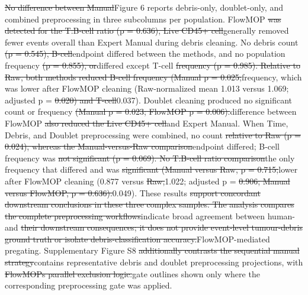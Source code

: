 \documentclass[
  11pt,
  a4paper,
]{article}
\begin{document}
{\color{revisionred}\sout{No difference between
Manual}}{\color{revisionblue}Figure 6 reports debris-only,
doublet-only,} and {\color{revisionblue}combined preprocessing in three
subcolumns per population.} FlowMOP {\color{revisionred}\sout{was
detected for the T:B-cell ratio (p = 0.636), Live CD45+
cell}}{\color{revisionblue}generally removed fewer events overall than
Expert Manual during debris cleaning. No debris} count
{\color{revisionred}\sout{(p = 0.545),
B-cell}}{\color{revisionblue}endpoint differed between the methods, and
no population} frequency {\color{revisionred}\sout{(p = 0.855),
or}}{\color{revisionblue}differed except} T-cell
{\color{revisionred}\sout{frequency (p = 0.985). Relative to Raw, both
methods reduced B-cell frequency (Manual p =
0.025;}}{\color{revisionblue}frequency, which was lower after} FlowMOP
{\color{revisionblue}cleaning (Raw-normalized mean 1.013 versus 1.069;
adjusted} p = {\color{revisionred}\sout{0.020) and
T-cell}}{\color{revisionblue}0.037). Doublet cleaning produced no
significant count or} frequency {\color{revisionred}\sout{(Manual p =
0.023; FlowMOP p = 0.006).}}{\color{revisionblue}difference between}
FlowMOP {\color{revisionred}\sout{also reduced the Live CD45+
cell}}{\color{revisionblue}and Expert Manual. When Time, Debris, and
Doublet preprocessing were combined, no} count
{\color{revisionred}\sout{relative to Raw (p = 0.024), whereas the
Manual-versus-Raw comparison}}{\color{revisionblue}endpoint differed;
B-cell frequency} was {\color{revisionred}\sout{not significant (p =
0.069). No T:B-cell ratio comparison}}{\color{revisionblue}the only
frequency that differed and} was {\color{revisionred}\sout{significant
(Manual versus Raw, p = 0.715;}}{\color{revisionblue}lower after}
FlowMOP {\color{revisionblue}cleaning (0.877} versus
{\color{revisionred}\sout{Raw,}}{\color{revisionblue}1.022; adjusted} p
= {\color{revisionred}\sout{0.906; Manual versus FlowMOP, p =
0.636).}}{\color{revisionblue}0.049).} These results
{\color{revisionred}\sout{support concordant downstream conclusions in
these three complex samples. The analysis compares the complete
preprocessing workflows}}{\color{revisionblue}indicate broad agreement
between human-} and {\color{revisionred}\sout{their downstream
consequences; it does not provide event-level tumour-debris ground truth
or isolate debris-classification
accuracy.}}{\color{revisionblue}FlowMOP-mediated pregating.
Supplementary} Figure S8 {\color{revisionred}\sout{additionally
contrasts the sequential manual strategy}}{\color{revisionblue}contains
representative debris and doublet preprocessing projections,} with
{\color{revisionred}\sout{FlowMOP\textquotesingle s parallel exclusion
logic.}}{\color{revisionblue}gate outlines shown only where the
corresponding preprocessing gate was applied.}
\end{document}
